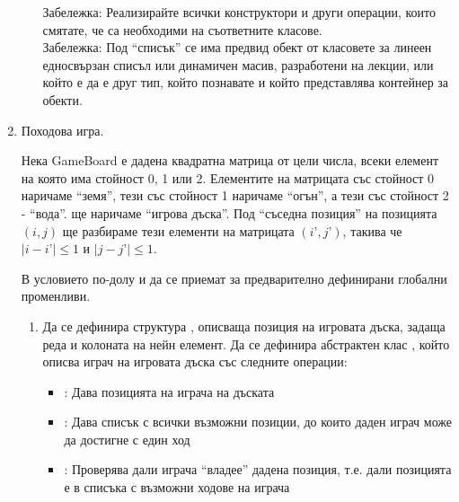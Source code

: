 \begin{enumerate}
\begin{enumerate}[label=\alph*)]


      \begin{flushleft}
      Забележка: Реализирайте всички конструктори и други операции, които смятате, че са необходими на съответните класове.\\

      Забележка: Под ``списък'' се има предвид обект от класовете за линеен едносвързан списъл или динамичен масив, разработени на лекции, или който е да е друг тип, който познавате и който представлява контейнер за обекти.

      \end{flushleft}

    \end{enumerate}


    \item Походова игра.

    Нека GameBoard е дадена квадратна матрица  от цели числа, всеки елемент на която има стойност 0, 1 или 2. Елементите на матрицата със стойност 0 наричаме ``земя'', тези със стойност 1 наричаме ``огън'', а тези със стойност 2 - ``вода''.  ще наричаме ``игрова дъска''. Под ``съседна позиция'' на позицията $(i,j)$ ще разбираме тези елементи на матрицата $(i’,j’)$, такива че $|i-i’| \leq 1$ и $|j-j’| \leq 1$.

    В условието по-долу  и  да се приемат за предварително дефинирани глобални променливи.

    \begin{enumerate}[label=\alph*)]
      \item Да се дефинира структура , описваща позиция на игровата дъска, задаща реда и колоната на нейн елемент. Да се дефинира абстрактен клас , който описва играч на игровата дъска със следните операции:

      \begin{itemize}
        \item {}: Дава позицията на играча на дъската
        \item {}: Дава списък с всички възможни позиции, до които даден играч може да достигне с един ход
        \item {}: Проверява дали играча ``владее'' дадена позиция, т.е. дали позицията е в списъка с възможни ходове на играча


\end{itemize}
\end{enumerate}
\end{enumerate}
